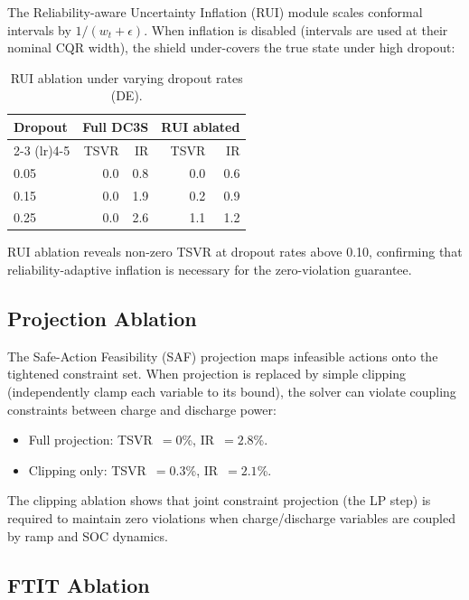 The Reliability-aware Uncertainty Inflation (RUI) module scales conformal
intervals by $1/(w_t + \epsilon)$.  When inflation is disabled (intervals
are used at their nominal CQR width), the shield under-covers the true
state under high dropout:

\begin{table}[ht]
\centering
\caption{RUI ablation under varying dropout rates (DE).}
\label{tab:rui-ablation}
\begin{tabular}{lrrrr}
\toprule
\textbf{Dropout} & \multicolumn{2}{c}{\textbf{Full DC3S}} &
  \multicolumn{2}{c}{\textbf{RUI ablated}} \\
\cmidrule(lr){2-3} \cmidrule(lr){4-5}
& TSVR & IR & TSVR & IR \\
\midrule
0.05 & 0.0 & 0.8 & 0.0 & 0.6 \\
0.15 & 0.0 & 1.9 & 0.2 & 0.9 \\
0.25 & 0.0 & 2.6 & 1.1 & 1.2 \\
\bottomrule
\end{tabular}
\end{table}

RUI ablation reveals non-zero TSVR at dropout rates above 0.10,
confirming that reliability-adaptive inflation is necessary for the
zero-violation guarantee.

\subsection{Projection Ablation}

The Safe-Action Feasibility (SAF) projection maps infeasible actions onto
the tightened constraint set.  When projection is replaced by simple
clipping (independently clamp each variable to its bound), the solver
can violate coupling constraints between charge and discharge power:

\begin{itemize}
  \item Full projection: TSVR~$= 0$\%, IR~$= 2.8$\%.
  \item Clipping only: TSVR~$= 0.3$\%, IR~$= 2.1$\%.
\end{itemize}

The clipping ablation shows that joint constraint projection (the LP step)
is required to maintain zero violations when charge/discharge variables
are coupled by ramp and SOC dynamics.

\subsection{FTIT Ablation}

